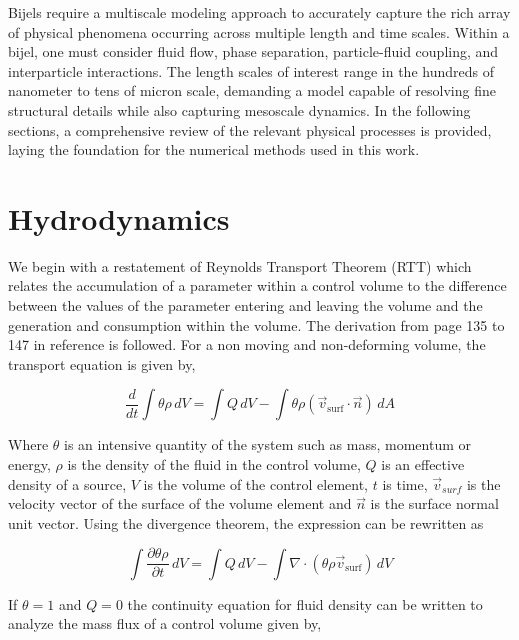 Bijels require a multiscale modeling approach to accurately capture the rich array of physical phenomena 
occurring across multiple length and time scales. Within a bijel, one must consider fluid flow, phase separation, particle-fluid coupling, and interparticle 
interactions. The length scales of interest range in the hundreds of nanometer to  tens of micron scale, demanding a model capable of resolving fine structural details while also 
capturing mesoscale dynamics. In the following sections, a comprehensive review of the relevant physical processes is provided, laying the foundation for the 
numerical methods used in this work.

\section{Hydrodynamics}

We begin with a restatement of Reynolds Transport Theorem (RTT) which relates the accumulation of a parameter within a control volume to the difference between the values
of the parameter entering and leaving the volume and the generation and consumption within the volume. The derivation from page 135 to 147 in reference \cite{batchelor_introduction_2000}
is followed. For a non moving and non-deforming volume, the transport equation is given by,

\begin{equation}
    \frac{d}{dt} \int \theta \rho \, dV = \int Q \, dV - \int \theta \rho (\vec{v}_{\text{surf}} \cdot \vec{n}) \, dA
\end{equation}

Where $\theta$ is an intensive quantity of the system such as mass, momentum or energy, $\rho$ is the density of the fluid in the control volume, $Q$ is an effective density
of a source, $V$ is the volume of the control element, $t$ is time, $\vec{v}_{surf}$ is the velocity vector 
of the surface of the volume element and $\vec{n}$ is the surface normal unit vector. \cite{batchelor_introduction_2000} Using the divergence theorem, the expression can be rewritten as

\begin{equation}
    \int \frac{\partial \theta \rho}{\partial t} \, dV = \int Q \, dV - \int \nabla \cdot (\theta \rho \vec{v}_{\text{surf}}) \, dV
\end{equation}

If $\theta = 1$ and $Q = 0$ the continuity equation for fluid density can be written to analyze the mass flux of a control volume given by,

